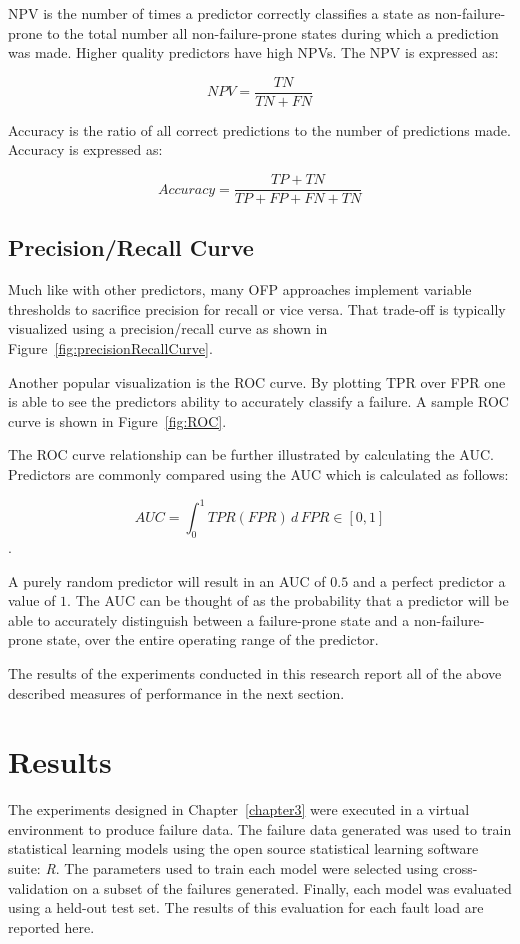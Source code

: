 \ac{NPV} is the number of times a predictor correctly classifies a state as
non-failure-prone to the total number all non-failure-prone states during which
a prediction was made.  Higher quality predictors have high \ac{NPV}s.  The
\ac{NPV} is expressed as:

\[ \mathit{NPV}
	= \dfrac{TN}{TN + FN}
\]

Accuracy is the ratio of all correct predictions to the number of predictions
made.  Accuracy is expressed as:

\[ Accuracy 
	= \dfrac{TP + TN}{TP + FP + FN + TN}
\]

\subsection{Precision/Recall Curve}
Much like with other predictors, many \ac{OFP} approaches implement variable
thresholds to sacrifice precision for recall or vice versa.  That trade-off is
typically visualized using a precision/recall curve as shown in
Figure~\ref{fig:precisionRecallCurve}.

\figprecisionRecallCurve{3in}

Another popular visualization is the \ac{ROC} curve.  By plotting \ac{TPR} over
\ac{FPR} one is able to see the predictors ability to accurately classify a
failure.  A sample \ac{ROC} curve is shown in Figure~\ref{fig:ROC}.

\figROC{3in}

The \ac{ROC} curve relationship can be further illustrated by calculating the
\ac{AUC}.  Predictors are commonly compared using the \ac{AUC} which is
calculated as follows:

$$AUC = \int_{0}^{1} \mathit{TPR}(\mathit{FPR}) \,d\,\mathit{FPR} \in [0,1]$$.

A purely random predictor will result in an \ac{AUC} of $0.5$ and a perfect
predictor a value of $1$.  The \ac{AUC} can be thought of as the probability
that a predictor will be able to accurately distinguish between a failure-prone
state and a non-failure-prone state, over the entire operating range of the
predictor.

The results of the experiments conducted in this research report all of the
above described measures of performance in the next section.

\section{Results} \label{results}
The experiments designed in Chapter~\ref{chapter3} were executed in a virtual
environment to produce failure data.  The failure data generated was used to
train statistical learning models using the open source statistical learning
software suite: \emph{R}.  The parameters used to train each model were
selected using cross-validation on a subset of the failures generated.
Finally, each model was evaluated using a held-out test set.  The results of
this evaluation for each fault load are reported here.

